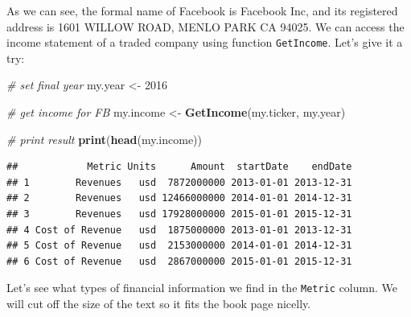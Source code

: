 \documentclass[11pt,]{book}
\newenvironment{Shaded}{\begin{snugshade}}{\end{snugshade}}
\newcommand{\KeywordTok}[1]{\textcolor[rgb]{0.27,0.27,0.27}{\textbf{#1}}}
\newcommand{\DecValTok}[1]{\textcolor[rgb]{0.06,0.06,0.06}{#1}}
\newcommand{\StringTok}[1]{\textcolor[rgb]{0.5,0.5,0.5}{#1}}
\newcommand{\CommentTok}[1]{\textcolor[rgb]{0.56,0.35,0.01}{\textit{#1}}}
\newcommand{\OperatorTok}[1]{\textcolor[rgb]{0.81,0.36,0.00}{\textbf{#1}}}
\newcommand{\NormalTok}[1]{#1}
\begin{document}
As we can see, the formal name of Facebook is Facebook Inc, and its
registered address is 1601 WILLOW ROAD, MENLO PARK CA 94025. We can
access the income statement of a traded company using function
\texttt{GetIncome}. Let's give it a try:

\begin{Shaded}
\begin{Highlighting}[]
\CommentTok{# set final year}
\NormalTok{my.year <-}\StringTok{ }\DecValTok{2016}

\CommentTok{# get income for FB}
\NormalTok{my.income <-}\StringTok{ }\KeywordTok{GetIncome}\NormalTok{(my.ticker, my.year)}

\CommentTok{# print result}
\KeywordTok{print}\NormalTok{(}\KeywordTok{head}\NormalTok{(my.income))}
\end{Highlighting}
\end{Shaded}

\begin{verbatim}
##            Metric Units      Amount  startDate    endDate
## 1        Revenues   usd  7872000000 2013-01-01 2013-12-31
## 2        Revenues   usd 12466000000 2014-01-01 2014-12-31
## 3        Revenues   usd 17928000000 2015-01-01 2015-12-31
## 4 Cost of Revenue   usd  1875000000 2013-01-01 2013-12-31
## 5 Cost of Revenue   usd  2153000000 2014-01-01 2014-12-31
## 6 Cost of Revenue   usd  2867000000 2015-01-01 2015-12-31
\end{verbatim}

Let's see what types of financial information we find in the
\texttt{Metric} column. We will cut off the size of the text so it fits
the book page nicelly.

\begin{Shaded}
\end{Shaded}
\end{document}

